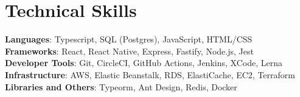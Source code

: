\documentclass[letterpaper,11pt]{article}
\begin{document}
\section{Technical Skills}
 \begin{itemize}[leftmargin=0.15in, label={}]
    \small{\item{
     \textbf{Languages}{: Typescript, SQL (Postgres), JavaScript, HTML/CSS} \\
     \textbf{Frameworks}{: React, React Native, Express, Fastify, Node.js, Jest } \\
     \textbf{Developer Tools}{: Git, CircleCI, GitHub Actions, Jenkins, XCode, Lerna } \\
     \textbf{Infrastructure}{: AWS, Elastic Beanstalk, RDS, ElastiCache, EC2, Terraform } \\
     \textbf{Libraries and Others}{: Typeorm, Ant Design, Redis, Docker } \\
    }}
 \end{itemize}

\end{document}
